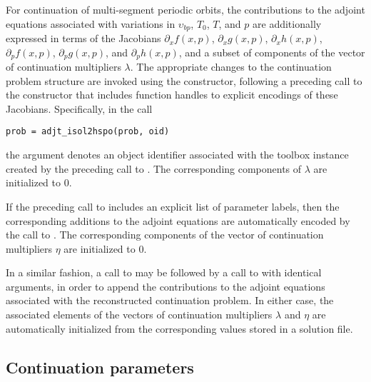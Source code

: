 For continuation of multi-segment periodic orbits, the contributions to the adjoint equations associated with variations in $\upsilon_{bp}$, $T_0$, $T$, and $p$ are additionally expressed in terms of the Jacobians $\partial_x f(x,p)$, $\partial_x g(x,p)$, $\partial_x h(x,p)$, $\partial_p f(x,p)$, $\partial_p g(x,p)$, and $\partial_p h(x,p)$, and a subset of components of the vector of continuation multipliers $\lambda$. The appropriate changes to the continuation problem structure are invoked using the  constructor, following a preceding call to the  constructor that includes function handles to explicit encodings of these Jacobians.  Specifically, in the call
\begin{lstlisting}[language=coco-highlight]
prob = adjt_isol2hspo(prob, oid)
\end{lstlisting}
the  argument denotes an object identifier associated with the toolbox instance created by the preceding call to . The corresponding components of $\lambda$ are initialized to $0$.

If the preceding call to  includes an explicit list of parameter labels, then the corresponding additions to the adjoint equations are automatically encoded by the call to . The corresponding components of the vector of continuation multipliers $\eta$ are initialized to $0$.

In a similar fashion, a call to  may be followed by a call to  with identical arguments, in order to append the contributions to the adjoint equations associated with the reconstructed continuation problem. In either case, the associated elements of the vectors of continuation multipliers $\lambda$ and $\eta$ are automatically initialized from the corresponding values stored in a solution file.


\subsection{Continuation parameters}

